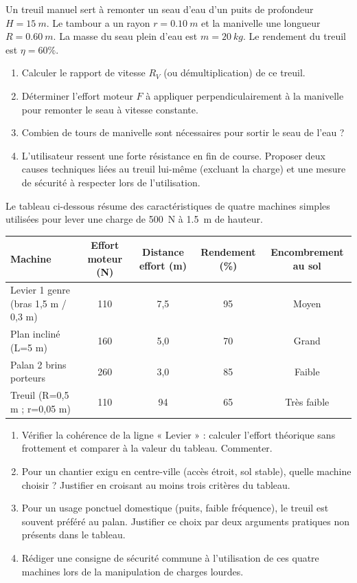 \documentclass[11pt]{article}
\begin{document}
\begin{exercice}
Un treuil manuel sert à remonter un seau d'eau d'un puits de profondeur $H = \SI{15}{m}$. Le tambour a un rayon $r = \SI{0,10}{m}$ et la manivelle une longueur $R = \SI{0,60}{m}$. La masse du seau plein d'eau est $m = \SI{20}{kg}$. Le rendement du treuil est $\eta = 60\%$.
\begin{enumerate}
    \item Calculer le rapport de vitesse $R_V$ (ou démultiplication) de ce treuil.
    \item Déterminer l'effort moteur $F$ à appliquer perpendiculairement à la manivelle pour remonter le seau à vitesse constante.
    \item Combien de tours de manivelle sont nécessaires pour sortir le seau de l'eau ?
    \item L'utilisateur ressent une forte résistance en fin de course. Proposer deux causes techniques liées au treuil lui-même (excluant la charge) et une mesure de sécurité à respecter lors de l'utilisation.
\end{enumerate}
\end{exercice}

\begin{exercice}
Le tableau ci-dessous résume des caractéristiques de quatre machines simples utilisées pour lever une charge de \SI{500}{N} à \SI{1,5}{m} de hauteur.

\begin{tabularx}{\linewidth}{@{}Xcccc@{}}
\toprule
Machine & Effort moteur (N) & Distance effort (m) & Rendement (\%) & Encombrement au sol \\
\midrule
Levier 1\up{er} genre (bras 1,5 m / 0,3 m) & 110 & 7,5 & 95 & Moyen \\
Plan incliné (L=5 m) & 160 & 5,0 & 70 & Grand \\
Palan 2 brins porteurs & 260 & 3,0 & 85 & Faible \\
Treuil (R=0,5 m ; r=0,05 m) & 110 & 94 & 65 & Très faible \\
\bottomrule
\end{tabularx}

\begin{enumerate}
    \item Vérifier la cohérence de la ligne « Levier » : calculer l'effort théorique sans frottement et comparer à la valeur du tableau. Commenter.
    \item Pour un chantier exigu en centre-ville (accès étroit, sol stable), quelle machine choisir ? Justifier en croisant au moins trois critères du tableau.
    \item Pour un usage ponctuel domestique (puits, faible fréquence), le treuil est souvent préféré au palan. Justifier ce choix par deux arguments pratiques non présents dans le tableau.
    \item Rédiger une consigne de sécurité commune à l'utilisation de ces quatre machines lors de la manipulation de charges lourdes.
\end{enumerate}
\end{exercice}
\end{document}
